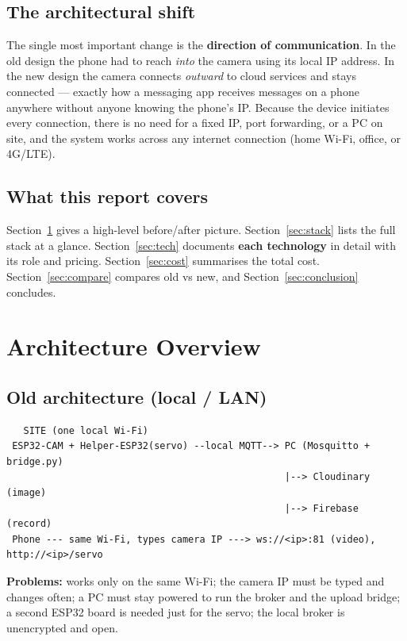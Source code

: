 \documentclass[11pt,a4paper]{article}
\begin{document}
\subsection{The architectural shift}
The single most important change is the \textbf{direction of communication}. In the old design
the phone had to reach \emph{into} the camera using its local IP address. In the new design the
camera connects \emph{outward} to cloud services and stays connected --- exactly how a messaging
app receives messages on a phone anywhere without anyone knowing the phone's IP. Because the
device initiates every connection, there is no need for a fixed IP, port forwarding, or a PC on
site, and the system works across any internet connection (home Wi-Fi, office, or 4G/LTE).

\subsection{What this report covers}
Section~\ref{sec:overview} gives a high-level before/after picture. Section~\ref{sec:stack}
lists the full stack at a glance. Section~\ref{sec:tech} documents \textbf{each technology} in
detail with its role and pricing. Section~\ref{sec:cost} summarises the total cost.
Section~\ref{sec:compare} compares old vs new, and Section~\ref{sec:conclusion} concludes.

\section{Architecture Overview}\label{sec:overview}

\subsection{Old architecture (local / LAN)}
\begin{lstlisting}
   SITE (one local Wi-Fi)
 ESP32-CAM + Helper-ESP32(servo) --local MQTT--> PC (Mosquitto + bridge.py)
                                                 |--> Cloudinary (image)
                                                 |--> Firebase (record)
 Phone --- same Wi-Fi, types camera IP ---> ws://<ip>:81 (video), http://<ip>/servo
\end{lstlisting}
\textbf{Problems:} works only on the same Wi-Fi; the camera IP must be typed and changes
often; a PC must stay powered to run the broker and the upload bridge; a second ESP32 board is
needed just for the servo; the local broker is unencrypted and open.
\end{document}
